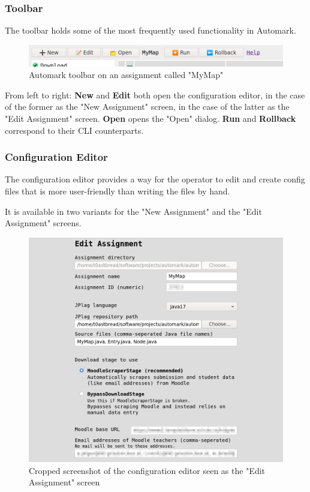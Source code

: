 \documentclass[12pt,a4paper,oneside]{report}
\begin{document}
	\subsubsection{Toolbar}
	The toolbar holds some of the most frequently used functionality in Automark.

	\begin{figure}[h]
		\includegraphics[width=\textwidth]{automark_toolbar.png}
		\vskip0pt
		\caption{Automark toolbar on an assignment called "MyMap"}
	\end{figure}

	From left to right: \textbf{New} and \textbf{Edit} both open the configuration editor, in the case of the former as the "New Assignment" screen, in the case of the latter as the "Edit Assignment" screen. \textbf{Open} opens the "Open" dialog. \textbf{Run} and \textbf{Rollback} correspond to their CLI counterparts.

	\pagebreak
	\subsubsection{Configuration Editor}
	The configuration editor provides a way for the operator to edit and create config files that is more user-friendly than writing the files by hand.

	It is available in two variants for the "New Assignment" and the "Edit Assignment" screens.

	\begin{figure}[h]
		\includegraphics[width=\textwidth]{automark_configuration_editor.png}
		\vskip0pt
		\caption{Cropped screenshot of the configuration editor seen as the "Edit Assignment" screen}
	\end{figure}
\end{document}
